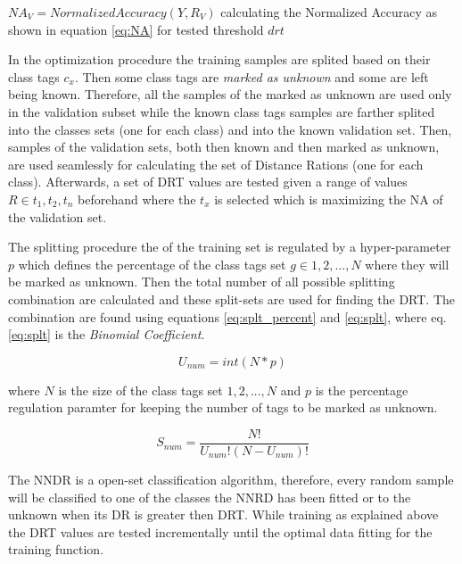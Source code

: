 \documentclass[runningheads]{llncs}
\begin{document}
\begin{algorithm}[H]
{{    }

    $NA_{V} = NormalizedAccuracy(Y, R_{V})$ calculating the Normalized Accuracy as shown in equation \ref{eq:NA} for tested threshold $drt$\;


}

\end{algorithm}

In the optimization procedure the training samples are splited based on their class tags $c_{x}$. Then some class tags are \textit{marked as unknown} and some are left being known. Therefore, all the samples of the marked as unknown are used only in the validation subset while the known class tags samples are farther splited into the classes sets (one for each class) and into the known validation set. Then, samples of the validation sets, both then known and then marked as unknown, are used seamlessly for calculating the set of Distance Rations (one for each class). Afterwards, a set of DRT values are tested given a range of values $R \in {t_{1}, t_{2}, t_{n}}$ beforehand where the $t_{x}$ is selected which is maximizing the NA of the validation set.

The splitting procedure the of the training set is regulated by a hyper-parameter $p$ which defines the percentage of the class tags set $g \in {1,2,...,N}$ where they will be marked as unknown. Then the total number of all possible splitting combination are calculated and these split-sets are used for finding the DRT. The combination are found using equations \ref{eq:splt_percent} and \ref{eq:splt}, where eq.\ref{eq:splt} is the \textit{Binomial Coefficient}.

\begin{equation} \label{eq:splt_percent}
    U_{num} = int(N * p)
\end{equation}

\noindent
where $N$ is the size of the class tags set ${1,2,...,N}$ and $p$ is the percentage regulation paramter for keeping the number of tags to be marked as unknown.

\begin{equation} \label{eq:splt}
    S_{num} = \frac{N!}{U_{num}!(N-U_{num})!}
\end{equation}

The NNDR is a open-set classification algorithm, therefore, every random sample will be classified to one of the classes the NNRD has been fitted or to the unknown when its DR is greater then DRT. While training as explained above the DRT values are tested incrementally until the optimal data fitting for the training function.
\end{document}
